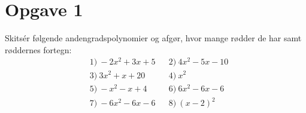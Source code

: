 \section*{Opgave 1}
Skitsér følgende andengradspolynomier og afgør, hvor mange rødder de har samt røddernes fortegn:
\begin{align*}
&1) \ -2x^2+3x+5   &&2) \ 4x^2-5x-10   \\
&3) \  3x^2+x+20  &&4) \ x^2   \\
&5) \  -x^2-x+4   &&6) \ 6x^2-6x-6   \\
&7) \   -6x^2-6x-6 &&8) \ (x-2)^2   \\ 
\end{align*}